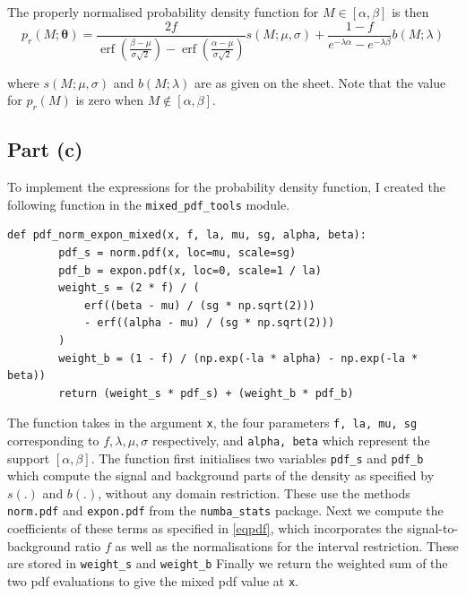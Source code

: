 \documentclass[12pt]{article}
\DeclareMathOperator{\erf}{erf}
\begin{document}
The properly normalised probability density function for $M\in[\alpha,\beta]$ is then
\begin{equation}
\label{eqpdf}
    p_r(M;\boldsymbol{\theta}) = \frac{2f}{\erf\left(\frac{\beta - \mu}{\sigma\sqrt{2}}\right) - \erf\left(\frac{\alpha - \mu}{\sigma\sqrt{2}}\right)}s(M;\mu,\sigma) + \frac{1-f}{e^{-\lambda\alpha} - e^{-\lambda\beta}}b(M;\lambda)
\end{equation}

where $s(M;\mu,\sigma)$ and $b(M;\lambda)$ are as given on the sheet. Note that the value for $p_r(M)$ is zero when $M\notin[\alpha,\beta]$.

\subsection*{Part (c)}

To implement the expressions for the probability density function, I created the following function in the \texttt{mixed\_pdf\_tools} module.

\begin{lstlisting}[caption=Function implementing pdf for part (c).,]
    def pdf_norm_expon_mixed(x, f, la, mu, sg, alpha, beta):
        pdf_s = norm.pdf(x, loc=mu, scale=sg)
        pdf_b = expon.pdf(x, loc=0, scale=1 / la)
        weight_s = (2 * f) / (
            erf((beta - mu) / (sg * np.sqrt(2)))
            - erf((alpha - mu) / (sg * np.sqrt(2)))
        )
        weight_b = (1 - f) / (np.exp(-la * alpha) - np.exp(-la * beta))
        return (weight_s * pdf_s) + (weight_b * pdf_b)
\end{lstlisting}

The function takes in the argument \texttt{x}, the four parameters \texttt{f, la, mu, sg} corresponding to $f, \lambda, \mu, \sigma$ respectively, and \texttt{alpha, beta} which represent the support $[\alpha,\beta]$.
The function first initialises two variables \texttt{pdf\_s} and \texttt{pdf\_b} which compute the signal and background parts of the density as specified by $s(.)$ and $b(.)$, without any domain restriction.
These use the methods \texttt{norm.pdf} and \texttt{expon.pdf} from the \texttt{numba\_stats} package.
Next we compute the coefficients of these terms as specified in \ref{eqpdf}, which incorporates the signal-to-background ratio $f$ as well as the normalisations for the interval restriction.
These are stored in \texttt{weight\_s} and \texttt{weight\_b}
Finally we return the weighted sum of the two pdf evaluations to give the mixed pdf value at \texttt{x}.
\end{document}

